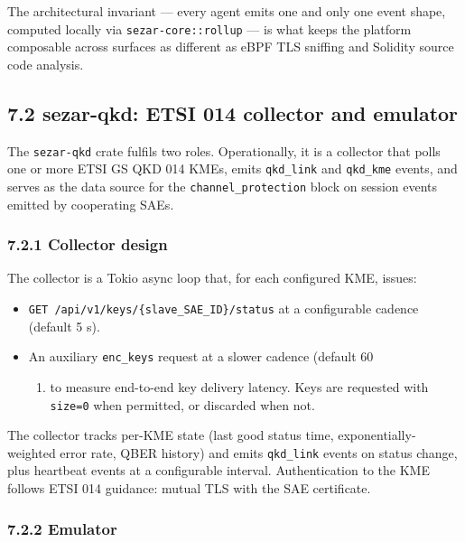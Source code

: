 The architectural invariant --- every agent emits one and only one event
shape, computed locally via \texttt{sezar-core::rollup} --- is what
keeps the platform composable across surfaces as different as eBPF TLS
sniffing and Solidity source code analysis.

\subsection{7.2 sezar-qkd: ETSI 014 collector and
emulator}\label{sezar-qkd-etsi-014-collector-and-emulator}

The \texttt{sezar-qkd} crate fulfils two roles. Operationally, it is a
collector that polls one or more ETSI GS QKD 014 KMEs, emits
\texttt{qkd\_link} and \texttt{qkd\_kme} events, and serves as the data
source for the \texttt{channel\_protection} block on session events
emitted by cooperating SAEs.

\subsubsection{7.2.1 Collector design}\label{collector-design}

The collector is a Tokio async loop that, for each configured KME,
issues:

\begin{itemize}
\tightlist
\item
  \texttt{GET\ /api/v1/keys/\{slave\_SAE\_ID\}/status} at a configurable
  cadence (default 5 s).
\item
  An auxiliary \texttt{enc\_keys} request at a slower cadence (default
  60

  \begin{enumerate}
  \def\labelenumi{\alph{enumi})}
  \setcounter{enumi}{18}
  \tightlist
  \item
    to measure end-to-end key delivery latency. Keys are requested with
    \texttt{size=0} when permitted, or discarded when not.
  \end{enumerate}
\end{itemize}

The collector tracks per-KME state (last good status time,
exponentially-weighted error rate, QBER history) and emits
\texttt{qkd\_link} events on status change, plus heartbeat events at a
configurable interval. Authentication to the KME follows ETSI 014
guidance: mutual TLS with the SAE certificate.

\subsubsection{7.2.2 Emulator}\label{emulator}

